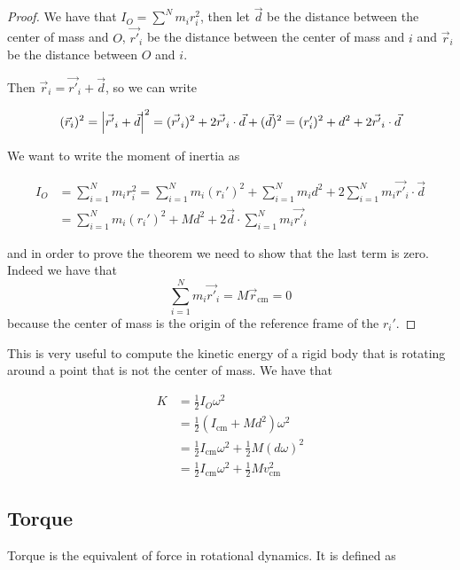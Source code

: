 \documentclass[14pt]{extarticle}
\begin{document}
\begin{proof}
    We have that $I_O = \sum^N m_i r_i^2$, then let $\vec{d}$ be the distance between the center of mass and $O$, $\vec{r'}_i$ be the distance between the center of mass and $i$ and $\vec{r}_i$ be the distance between $O$ and $i$.

    Then $\vec{r}_i = \vec{r'}_i + \vec{d}$, so we can write

    $$
        (\vec{r}_i)^2 = \abs{\vec{r'}_i + \vec{d}}^2 = (\vec{r'}_i)^2 + 2 \vec{r'}_i \cdot \vec{d} + (\vec{d})^2 = (r_i')^2 + d^2 + 2 \vec{r'}_i \cdot \vec{d}
    $$

    We want to write the moment of inertia as

    \begin{align}
        I_O & = \sum^N_{i = 1} m_i r_i^2 = \sum^N_{i = 1} m_i (r_i')^2 + \sum^N_{i = 1} m_i d^2 + 2 \sum^N_{i = 1} m_i \vec{r'}_i \cdot \vec{d} \\
            & = \sum^N_{i = 1} m_i (r_i')^2 + M d^2 + 2 \vec{d} \cdot \sum^N_{i = 1} m_i \vec{r'}_i
    \end{align}

    and in order to prove the theorem we need to show that the last term is zero.
    Indeed we have that
    $$
        \sum^N_{i = 1} m_i \vec{r'}_i = M \vec{r}_{\text{cm}} = 0
    $$
    because the center of mass is the origin of the reference frame of the $r_i'$.
\end{proof}

This is very useful to compute the kinetic energy of a rigid body that is rotating around a point that is not the center of mass.
We have that

\begin{align}
    K & = \frac{1}{2} I_O \omega^2                                           \\
      & = \frac{1}{2} (I_{\text{cm}} + M d^2) \omega^2                       \\
      & = \frac{1}{2} I_{\text{cm}} \omega^2 + \frac{1}{2} M (d \omega)^2    \\
      & = \frac{1}{2} I_{\text{cm}} \omega^2 + \frac{1}{2} M v_{\text{cm}}^2
\end{align}

\subsection{Torque}

Torque is the equivalent of force in rotational dynamics. It is defined as
\end{document}
